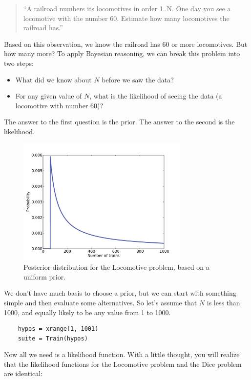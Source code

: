 \documentclass[12pt]{book}
\begin{document}
\begin{quote}
``A railroad numbers its locomotives in order 1..N.  One day you see a
locomotive with the number 60.  Estimate how many locomotives the
railroad has.''
\end{quote}

Based on this observation, we know the railroad has 60 or more
locomotives.  But how many more?  To apply Bayesian reasoning, we
can break this problem into two steps:

\begin{itemize}

\item What did we know about $N$ before we saw the data?

\item For any given value of $N$, what is the likelihood of
seeing the data (a locomotive with number 60)?

\end{itemize}

The answer to the first question is the prior.  The answer to the
second is the likelihood.

\begin{figure}
\centerline{\includegraphics[height=2.5in]{figs/train1.pdf}}
\caption{Posterior distribution for the Locomotive problem, based
on a uniform prior.}
\label{fig.train1}
\end{figure}

We don't have much basis to choose a prior, but we can
start with something simple and
then evaluate some alternatives.  So let's assume that $N$ is less
than 1000, and equally likely to be any value from 1 to 1000.

\begin{verbatim}
    hypos = xrange(1, 1001)
    suite = Train(hypos)
\end{verbatim}

Now all we need is a likelihood function.  With a little thought,
you will realize that the likelihood functions for the Locomotive
problem and the Dice problem are identical:
\end{document}
